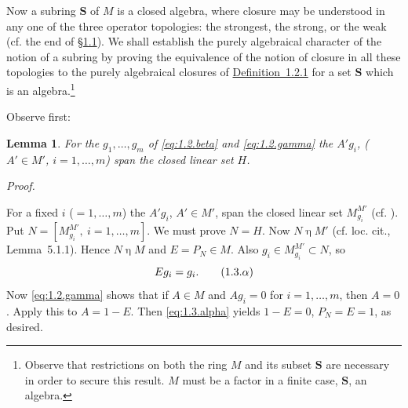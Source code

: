 \documentclass[b5paper,twoside]{article}
\newcommand{\secref}[2]{\hyperref[#1]{\mbox{\S#2}}}
\newcommand{\defref}[2]{\hyperref[#1]{\mbox{Definition~#2}}}
\theoremstyle{mvnplain}
\newtheorem{lemma}{Lemma}[section]
\renewenvironment{proof}[1][Proof]{%
  \par\addvspace{0.35\baselineskip}%
  \noindent\textit{#1.}\ \normalfont\ignorespaces
}{%
  \par\addvspace{0.35\baselineskip}%
}
\newcommand{\M}{\mathbf M}
\newcommand{\Hilbert}{\mathfrak H}
\def\M{M}%
\def\Hilbert{H}%
\def\mathfrak#1{#1}%
\begin{document}
Now a subring $\mathbf S$ of $\M$ is a closed algebra, where closure may be
understood in any one of the three operator topologies: the strongest, the
strong, or the weak (cf. the end of \secref{sec:1.1}{1.1}).  We shall establish
the purely algebraical character of the notion of a subring by proving the
equivalence of the notion of closure in all these topologies to the purely
algebraical closures of \defref{def:1.2.1}{1.2.1} for a set $\mathbf S$ which is
an algebra.\footnote{Observe that restrictions on both the ring $\M$ and its
subset $\mathbf S$ are necessary in order to secure this result.  $\M$ must be a
factor in a finite case, $\mathbf S$, an algebra.}

Observe first:
\begin{lemma}\label{lem:1.3.1}
For the $g_1,\ldots,g_m$ of \eqref{eq:1.2.beta} and \eqref{eq:1.2.gamma} the
$A'g_i$, ($A'\in\M'$, $i=1,\ldots,m$) span the closed linear set $\Hilbert$.
\end{lemma}
\begin{proof}
For a fixed $i$ ($=1,\ldots,m$) the $A'g_i$, $A'\in\M'$, span the closed
linear set $\mathfrak M_{g_i}^{\M'}$ (cf. \cite[p.~143,
Definition~5.1.1]{ref5}).  Put
$\mathfrak N=[\mathfrak M_{g_i}^{\M'},\ i=1,\ldots,m]$.  We must prove
$\mathfrak N=\Hilbert$.  Now $\mathfrak N\mathrel{\eta}\M'$ (cf. loc. cit.,
Lemma~5.1.1).  Hence $\mathfrak N\mathrel{\eta}\M$ and $E=P_{\mathfrak N}\in\M$.
Also $g_i\in\mathfrak M_{g_i}^{\M'}\subset\mathfrak N$, so
\begin{equation}
  Eg_i=g_i.
  \tag{1.3.\ensuremath{\alpha}}\label{eq:1.3.alpha}
\end{equation}
Now \eqref{eq:1.2.gamma} shows that if $A\in\M$ and $Ag_i=0$ for
$i=1,\ldots,m$, then $A=0$.  Apply this to $A=1-E$.  Then
\eqref{eq:1.3.alpha} yields $1-E=0$, $P_{\mathfrak N}=E=1$, as desired.
\end{proof}
\end{document}
